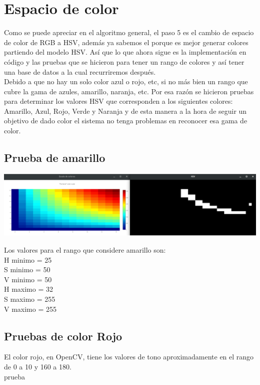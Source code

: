 
\section{Espacio de color}
Como se puede apreciar en el algoritmo general, el paso 5 es el cambio de espacio de color
de RGB a HSV, además ya sabemos el porque es mejor generar colores partiendo del
modelo HSV. Así que lo que ahora sigue es la implementación en código y las pruebas
que se hicieron para tener un rango de colores y así tener una base de datos a la
cual recurriremos después.\\
Debido a que no hay un solo color azul o rojo, etc, si no más bien un rango que cubre
la gama de azules, amarillo, naranja, etc. Por esa razón se hicieron pruebas para
determinar los valores HSV que corresponden a los siguientes colores: Amarillo, Azul,
Rojo, Verde y Naranja y de esta manera a la hora de seguir un objetivo de dado color
el sistema no tenga problemas en reconocer esa gama de color.
\subsection{Prueba de amarillo}
\begin{center}
    \includegraphics[width=1.0\textwidth]{Capitulo4/HSV_amarillo.eps}       
    \label{Fig6}
\end{center}
Los valores para el rango que considere amarillo son:\\
H minimo  = 25\\
S minimo = 50 \\
V minimo = 50 \\
H maximo = 32 \\
S maximo = 255 \\
V maximo = 255 

\subsection{Pruebas de color Rojo}
El color rojo, en OpenCV, tiene los valores de tono aproximadamente en 
el rango de 0 a 10 y 160 a 180.\\
prueba

